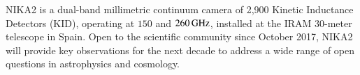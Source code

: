 \documentclass[traditionalabstract]{aa}
\begin{document}
%
   \date{Received XXXX XX, 2019; Accepted XXXX XX, 2019}
   \abstract
       {%
         NIKA2 is a dual-band millimetric continuum
         camera of 2,900 Kinetic Inductance Detectors (KID),
         operating at $150$ and $260\,\rm{GHz}$, installed at the IRAM 30-meter
         telescope %
          in Spain.
         Open to the scientific community since October 2017, NIKA2 
         will provide key observations for the next decade to 
         address a wide range of open questions in astrophysics and
         cosmology.}
\end{document}
